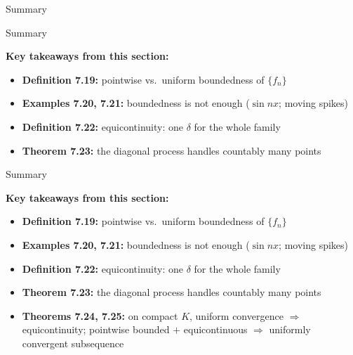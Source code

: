 \documentclass[aspectratio=169,12pt,t]{beamer}
\begin{document}
{\begin{frame}{Summary}
\end{frame}

\begin{frame}{Summary}
  \begin{hlbox}
  \small
  \textbf{Key takeaways from this section:}
  \begin{itemize}
    \item \textbf{Definition 7.19:} \alert{pointwise} vs.\ \alert{uniform}
      boundedness of $\{f_n\}$
    \item \textbf{Examples 7.20, 7.21:} boundedness is \alert{not enough}
      ($\sin nx$; moving spikes)
    \item \textbf{Definition 7.22:} \alert{equicontinuity}: one $\delta$ for
      the whole family
    \item \textbf{Theorem 7.23:} the \alert{diagonal process} handles countably
      many points
  \end{itemize}
  \end{hlbox}

\end{frame}

\begin{frame}{Summary}
  \begin{hlbox}
  \small
  \textbf{Key takeaways from this section:}
  \begin{itemize}
    \item \textbf{Definition 7.19:} \alert{pointwise} vs.\ \alert{uniform}
      boundedness of $\{f_n\}$
    \item \textbf{Examples 7.20, 7.21:} boundedness is \alert{not enough}
      ($\sin nx$; moving spikes)
    \item \textbf{Definition 7.22:} \alert{equicontinuity}: one $\delta$ for
      the whole family
    \item \textbf{Theorem 7.23:} the \alert{diagonal process} handles countably
      many points
    \item \textbf{Theorems 7.24, 7.25:} on compact $K$, uniform convergence
      $\Rightarrow$ equicontinuity; pointwise bounded $+$ equicontinuous
      $\Rightarrow$ \alert{uniformly convergent subsequence}
  \end{itemize}
  \end{hlbox}


\end{frame}}
\end{document}
